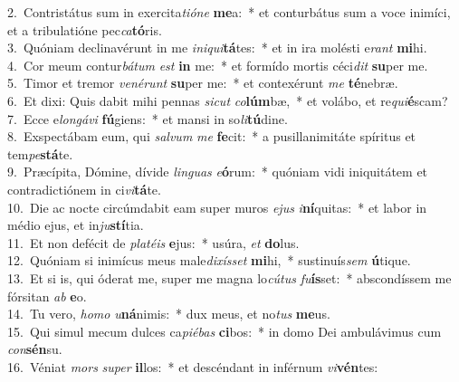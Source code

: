 {2.~}Contristátus sum in exercita\textit{ti}\textit{ó}\textit{ne} \textbf{me}a:~* et conturbátus sum a voce inimíci, et a tribulatióne pec\textit{ca}\textbf{tó}ris.\\
{3.~}Quóniam declinavérunt in me \textit{i}\textit{ni}\textit{qui}\textbf{tá}tes:~* et in ira molésti e\textit{rant} \textbf{mi}hi.\\
{4.~}Cor meum contur\textit{bá}\textit{tum} \textit{est} \textbf{in} me:~* et formído mortis céci\textit{dit} \textbf{su}per me.\\
{5.~}Timor et tremor \textit{ve}\textit{né}\textit{runt} \textbf{su}per me:~* et contexérunt \textit{me} \textbf{té}nebræ.\\
{6.~}Et dixi: Quis dabit mihi pennas \textit{si}\textit{cut} \textit{co}\textbf{lúm}bæ,~* et volábo, et re\textit{qui}\textbf{é}scam?\\
{7.~}Ecce e\textit{lon}\textit{gá}\textit{vi} \textbf{fú}giens:~* et mansi in so\textit{li}\textbf{tú}dine.\\
{8.~}Exspectábam eum, qui \textit{sal}\textit{vum} \textit{me} \textbf{fe}cit:~* a pusillanimitáte spíritus et tem\textit{pe}\textbf{stá}te.\\
{9.~}Præcípita, Dómine, dívide \textit{lin}\textit{guas} \textit{e}\textbf{ó}rum:~* quóniam vidi iniquitátem et contradictiónem in ci\textit{vi}\textbf{tá}te.\\
{10.~}Die ac nocte circúmdabit eam super muros \textit{e}\textit{jus} \textit{i}\textbf{ní}quitas:~* et labor in médio ejus, et in\textit{ju}\textbf{stí}tia.\\
{11.~}Et non defécit de \textit{pla}\textit{té}\textit{is} \textbf{e}jus:~* usúra, \textit{et} \textbf{do}lus.\\
{12.~}Quóniam si inimícus meus male\textit{di}\textit{xís}\textit{set} \textbf{mi}hi,~* sustinuís\textit{sem} \textbf{ú}tique.\\
{13.~}Et si is, qui óderat me, super me magna lo\textit{cú}\textit{tus} \textit{fu}\textbf{ís}set:~* abscondíssem me fórsitan \textit{ab} \textbf{e}o.\\
{14.~}Tu vero, \textit{ho}\textit{mo} \textit{u}\textbf{ná}nimis:~* dux meus, et no\textit{tus} \textbf{me}us.\\
{15.~}Qui simul mecum dulces ca\textit{pi}\textit{é}\textit{bas} \textbf{ci}bos:~* in domo Dei ambulávimus cum \textit{con}\textbf{sén}su.\\
{16.~}Véniat \textit{mors} \textit{su}\textit{per} \textbf{il}los:~* et descéndant in inférnum \textit{vi}\textbf{vén}tes:\\
